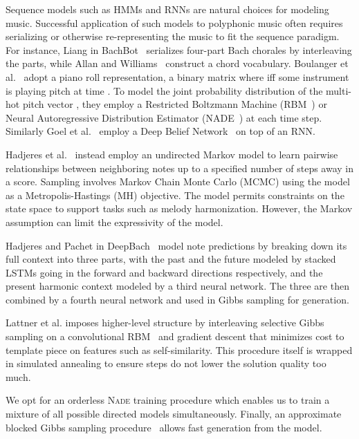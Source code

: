 \documentclass{article}
\newcommand{\nade}{\textsc{Nade}\xspace}
\begin{document}
Sequence models such as HMMs and RNNs are natural choices for modeling music.  
Successful application of such models to polyphonic music often requires serializing or otherwise re-representing the music to fit the sequence paradigm.
For instance, Liang in BachBot~\cite{liang2016bachbot} serializes four-part Bach chorales by interleaving the parts, while Allan and Williams~\cite{allan2005harmonising} construct a chord vocabulary.
Boulanger et al.~\cite{boulanger2012modeling} adopt a piano roll representation, a binary matrix  where  iff some instrument is playing pitch  at time .
To model the joint probability distribution of the multi-hot pitch vector , they employ a Restricted Boltzmann Machine (RBM~\cite{smolensky1986information,hinton2006fast}) or Neural Autoregressive Distribution Estimator (NADE~\cite{larochelle2011neural}) at each time step. 
Similarly Goel et al.~\cite{goel2014polyphonic} employ a Deep Belief Network~\cite{hinton2006fast} on top of an RNN.




Hadjeres et al.~\cite{hadjeres2016style} instead employ an undirected Markov model to learn pairwise relationships between neighboring notes up to a specified number of steps away in a score.  
Sampling involves Markov Chain Monte Carlo (\textsc{MCMC}) using the model as a Metropolis-Hastings (\textsc{MH}) objective.  The model permits constraints on the state space to support tasks such as melody harmonization. 
However, the Markov assumption can limit the expressivity of the model. 

Hadjeres and Pachet in DeepBach~\cite{hadjeres2016deepbach} model note predictions by breaking down its full context into three parts, with the past and the future modeled by stacked LSTMs going in the forward and backward directions respectively, and the present harmonic context modeled by a third neural network.  The three are then combined by a fourth neural network and used in Gibbs sampling for generation.  

Lattner et al. imposes higher-level structure by interleaving selective Gibbs sampling on a convolutional RBM~\cite{lattner2016imposing} and gradient descent that minimizes cost to template piece on features  such as self-similarity.  This procedure itself is wrapped in simulated annealing  to ensure steps do not lower the solution quality too much. 

We opt for an orderless \nade training procedure which enables us to train a mixture of all possible directed models simultaneously. Finally, an approximate blocked Gibbs sampling procedure~\cite{yao2014equivalence} allows fast generation from the model. 
\end{document}
